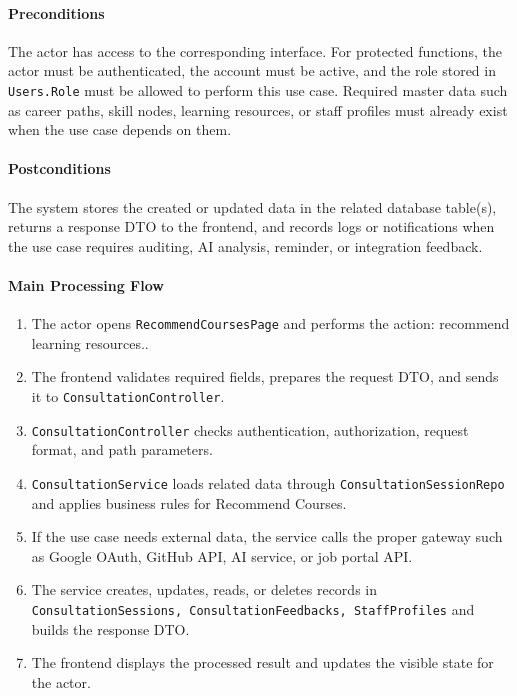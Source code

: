 \paragraph{Preconditions}

The actor has access to the corresponding interface. For protected functions, the actor must be authenticated, the account must be active, and the role stored in \texttt{Users.Role} must be allowed to perform this use case. Required master data such as career paths, skill nodes, learning resources, or staff profiles must already exist when the use case depends on them.

\paragraph{Postconditions}

The system stores the created or updated data in the related database table(s), returns a response DTO to the frontend, and records logs or notifications when the use case requires auditing, AI analysis, reminder, or integration feedback.

\paragraph{Main Processing Flow}

\begin{enumerate}
    \item The actor opens \texttt{RecommendCoursesPage} and performs the action: recommend learning resources..
    \item The frontend validates required fields, prepares the request DTO, and sends it to \texttt{ConsultationController}.
    \item \texttt{ConsultationController} checks authentication, authorization, request format, and path parameters.
    \item \texttt{ConsultationService} loads related data through \texttt{ConsultationSessionRepo} and applies business rules for Recommend Courses.
    \item If the use case needs external data, the service calls the proper gateway such as Google OAuth, GitHub API, AI service, or job portal API.
    \item The service creates, updates, reads, or deletes records in \texttt{ConsultationSessions, ConsultationFeedbacks, StaffProfiles} and builds the response DTO.
    \item The frontend displays the processed result and updates the visible state for the actor.
\end{enumerate}


